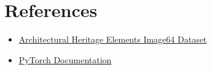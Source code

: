 \documentclass[12pt]{article}
\begin{document}
\section{References}
\begin{itemize}
    \item \href{https://www.kaggle.com/datasets/ikobzev/architectural-heritage-elements-image64-dataset}{Architectural Heritage Elements Image64 Dataset}
    \item \href{https://pytorch.org/docs/stable/index.html}{PyTorch Documentation}
\end{itemize}
\end{document}
